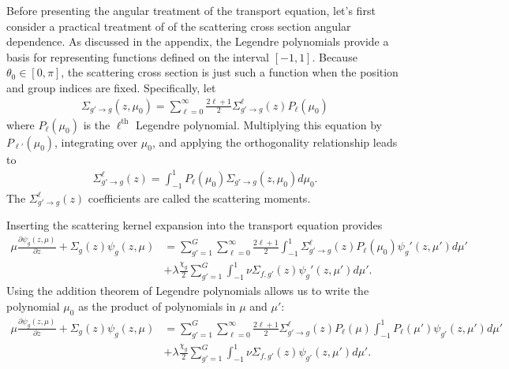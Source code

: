 \documentclass[11pt]{article}
\begin{document}
Before presenting the angular treatment of the transport equation, let's first consider a practical treatment of of the scattering cross section angular dependence.  As discussed in the appendix, the Legendre polynomials provide a basis for representing functions defined on the interval \([-1,1]\).  Because \(\theta_0 \in [0,\pi]\), the scattering cross section is just such a function when the position and group indices are fixed.  Specifically, let
\begin{align}
  \Sigma_{g'\rightarrow g}(z, \mu_0) = \sum_{\ell=0}^\infty \frac{2\ell+1}{2} \Sigma_{g' \rightarrow g}^\ell(z) P_\ell(\mu_0)
\end{align}
where \(P_\ell(\mu_0)\) is the \(\ell^\text{th}\) Legendre polynomial.  Multiplying this equation by \(P_{\ell'}(\mu_0)\), integrating over \(\mu_0\), and applying the orthogonality relationship leads to
\begin{align}
  \Sigma_{g' \rightarrow g}^\ell(z) = \int_{-1}^1 P_{\ell}(\mu_0)\Sigma_{g'\rightarrow g}(z, \mu_0) d\mu_0.
\end{align}
The \(\Sigma_{g' \rightarrow g}^\ell(z)\) coefficients are called the scattering moments.

Inserting the scattering kernel expansion into the transport equation provides
\begin{align}
  \mu \frac{\partial \psi_g(z,\mu)}{\partial z}
  + \Sigma_g(z) \psi_g(z,\mu)
  &= \sum_{g'=1}^G \sum_{\ell=0}^\infty \frac{2\ell+1}{2} \int_{-1}^1 \Sigma_{g' \rightarrow g}^\ell(z) P_\ell(\mu_0) \psi_g'(z,\mu') d\mu' \\
  &+ \lambda\frac{\chi_g}{2} \sum_{g'=1}^G \int_{-1}^1 \nu\Sigma_{f,g'}(z) \psi_g'(z,\mu') d\mu'.
\end{align}
Using the addition theorem of Legendre polynomials allows us to write the polynomial \(\mu_0\) as the product of polynomials in \(\mu\) and \(\mu'\):
\begin{align}
  \mu \frac{\partial \psi_g(z,\mu)}{\partial z}
  + \Sigma_g(z) \psi_g(z,\mu)
  &= \sum_{g'=1}^G \sum_{\ell=0}^\infty \frac{2\ell+1}{2} \Sigma_{g' \rightarrow g}^\ell(z) P_\ell(\mu) \int_{-1}^1 P_\ell(\mu') \psi_{g'}(z,\mu') d\mu' \\
  &+ \lambda\frac{\chi_g}{2} \sum_{g'=1}^G \int_{-1}^1 \nu\Sigma_{f,g'}(z) \psi_{g'}(z,\mu') d\mu'.
  \label{eq::1dTransportWithScatteringExpansion}
\end{align}
\end{document}
